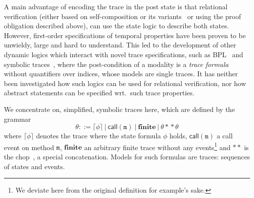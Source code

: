 A main advantage of encoding the trace in the post state is that relational verification (either based on self-composition or its variants~\cite{DBLP:conf/spc/DarvasHS05,DBLP:conf/csfw/BartheDR04,DBLP:conf/fm/BartheCK11} or using the proof obligation described above),
can use the state logic to describe both states.
However, first-order specifications of temporal properties have been proven to be unwieldy, large and hard to understand. 
This led to the development of other dynamic logics which interact with novel trace specifications, such as BPL~\cite{DBLP:conf/tableaux/Kamburjan19} and symbolic traces~\cite{DBLP:conf/tableaux/BubelDHN15}, where the post-condition of a modality is a \emph{trace formula} without quantifiers over indices, whose models are single traces.
It has neither been investigated how such logics can be used for relational verification, nor how abstract statements can be specified wrt.\ such trace properties.


We concentrate on, simplified, symbolic traces here, which are defined by the grammar
\[\theta ::= \lceil \phi \rceil ~|~ \mathsf{call}(\mathtt{m}) ~|~ \mathbf{finite} ~|~ \theta \ast\!\ast \theta \]
where $\lceil \phi \rceil$ denotes the trace where the state formula $\phi$ holds, $\mathsf{call}(\mathtt{m})$ a call event on method $\mathtt{m}$, $\mathbf{finite}$ an arbitrary finite trace without any events\footnote{We deviate here from the original definition for example's sake.} and $\ast\ast$ is the chop~\cite{DBLP:conf/tableaux/BubelDHN15}, a special concatenation.
Models for such formulas are traces: sequences of states and events.

